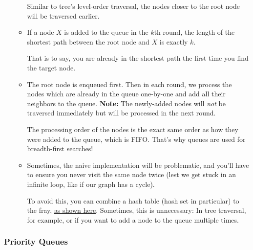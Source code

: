 \documentclass[12pt]{article}
\begin{document}
\begin{itemize}
\begin{itemize}
			Similar to tree's level-order traversal, the nodes closer to the root node will be traversed earlier.
			
			\item If a node $X$ is added to the queue in the $k$th round, the length of the shortest path between the root node and $X$ is exactly $k$. 
			
			That is to say, you are already in the shortest path the first time you find the target node.
			
			\item The root node is enqueued first. Then in each round, we process the nodes which are already in the queue one-by-one and add all their neighbors to the queue. \textbf{Note:} The newly-added nodes will \emph{not} be traversed immediately but will be processed in the next round.
			
			The processing order of the nodes is the exact same order as how they were added to the queue, which is FIFO. That's why queues are used for breadth-first searches!
			
			\item Sometimes, the naive implementation will be problematic, and you'll have to ensure you never visit the same node twice (lest we get stuck in an infinite loop, like if our graph has a cycle).
			
			To avoid this, you can combine a hash table (hash set in particular) to the fray, \href{https://leetcode.com/explore/learn/card/queue-stack/231/practical-application-queue/1372/}{as shown here}. Sometimes, this is unnecessary: In tree traversal, for example, or if you want to add a node to the queue multiple times.
		\end{itemize}
	\end{itemize}

	\subsubsection*{Priority Queues}
	
\end{document}

